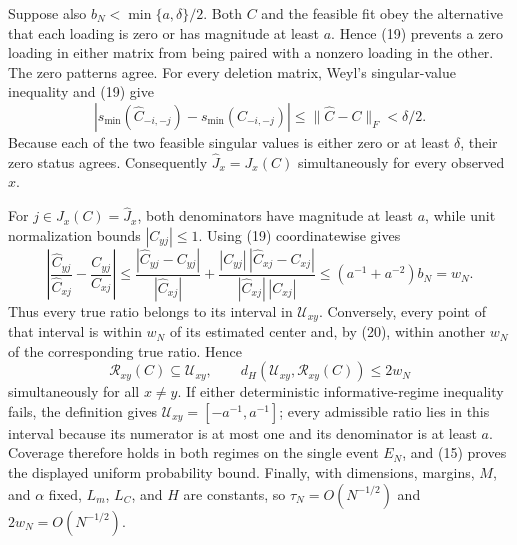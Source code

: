 Suppose also \(b_N<\min\{a,\delta\}/2\). Both \(C\) and the feasible fit obey the alternative that each loading is zero or has magnitude at least \(a\). Hence (19) prevents a zero loading in either matrix from being paired with a nonzero loading in the other. The zero patterns agree. For every deletion matrix, Weyl's singular-value inequality and (19) give
\[
 \left|s_{\min}(\widehat C_{-i,-j})-s_{\min}(C_{-i,-j})\right|
 \le\lVert\widehat C-C\rVert_F<\delta/2.
\]
Because each of the two feasible singular values is either zero or at least \(\delta\), their zero status agrees. Consequently \(\widehat J_x=J_x(C)\) simultaneously for every observed \(x\).

For \(j\in J_x(C)=\widehat J_x\), both denominators have magnitude at least \(a\), while unit normalization bounds \(|C_{yj}|\le1\). Using (19) coordinatewise gives
\[
 \left|\frac{\widehat C_{yj}}{\widehat C_{xj}}-\frac{C_{yj}}{C_{xj}}\right|
 \le \frac{|\widehat C_{yj}-C_{yj}|}{|\widehat C_{xj}|}
 +\frac{|C_{yj}|\,|\widehat C_{xj}-C_{xj}|}{|\widehat C_{xj}|\,|C_{xj}|}
 \le(a^{-1}+a^{-2})b_N=w_N. \tag{20}
\]
Thus every true ratio belongs to its interval in \(\mathcal U_{xy}\). Conversely, every point of that interval is within \(w_N\) of its estimated center and, by (20), within another \(w_N\) of the corresponding true ratio. Hence
\[
 \mathcal R_{xy}(C)\subseteq\mathcal U_{xy},
 \qquad
 d_H(\mathcal U_{xy},\mathcal R_{xy}(C))\le2w_N \tag{21}
\]
simultaneously for all \(x\ne y\). If either deterministic informative-regime inequality fails, the definition gives \(\mathcal U_{xy}=[-a^{-1},a^{-1}]\); every admissible ratio lies in this interval because its numerator is at most one and its denominator is at least \(a\). Coverage therefore holds in both regimes on the single event \(E_N\), and (15) proves the displayed uniform probability bound. Finally, with dimensions, margins, \(M\), and \(\alpha\) fixed, \(L_m\), \(L_C\), and \(H\) are constants, so \(\tau_N=O(N^{-1/2})\) and \(2w_N=O(N^{-1/2})\).